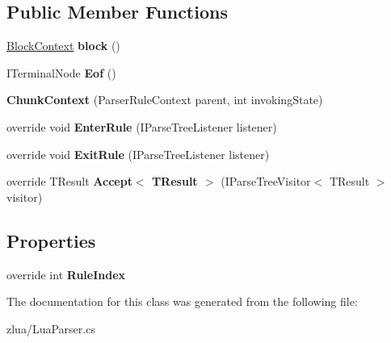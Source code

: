 \subsection*{Public Member Functions}
\begin{DoxyCompactItemize}
\item 
\mbox{\label{classzlua_1_1_lua_parser_1_1_chunk_context_aac78cc34d1f6eb11e37283cab6bce0c7}} 
\mbox{\hyperlink{classzlua_1_1_lua_parser_1_1_block_context}{Block\+Context}} {\bfseries block} ()
\item 
\mbox{\label{classzlua_1_1_lua_parser_1_1_chunk_context_ab7f2bf8adfd2b279aeebc24ace4a31e2}} 
I\+Terminal\+Node {\bfseries Eof} ()
\item 
\mbox{\label{classzlua_1_1_lua_parser_1_1_chunk_context_adaa468f357b40c0182336c6fe4f237dc}} 
{\bfseries Chunk\+Context} (Parser\+Rule\+Context parent, int invoking\+State)
\item 
\mbox{\label{classzlua_1_1_lua_parser_1_1_chunk_context_af1ddb755c62b1392d06bda6610f99e80}} 
override void {\bfseries Enter\+Rule} (I\+Parse\+Tree\+Listener listener)
\item 
\mbox{\label{classzlua_1_1_lua_parser_1_1_chunk_context_acb91d70bdebaffe38769d683404dcdce}} 
override void {\bfseries Exit\+Rule} (I\+Parse\+Tree\+Listener listener)
\item 
\mbox{\label{classzlua_1_1_lua_parser_1_1_chunk_context_a2a03eda253da522b610c89fb100fde0c}} 
override T\+Result {\bfseries Accept$<$ T\+Result $>$} (I\+Parse\+Tree\+Visitor$<$ T\+Result $>$ visitor)
\end{DoxyCompactItemize}
\subsection*{Properties}
\begin{DoxyCompactItemize}
\item 
\mbox{\label{classzlua_1_1_lua_parser_1_1_chunk_context_a30940588ba9699051d60c4aa1038c7aa}} 
override int {\bfseries Rule\+Index}
\end{DoxyCompactItemize}


The documentation for this class was generated from the following file\+:\begin{DoxyCompactItemize}
\item 
zlua/Lua\+Parser.\+cs\end{DoxyCompactItemize}
